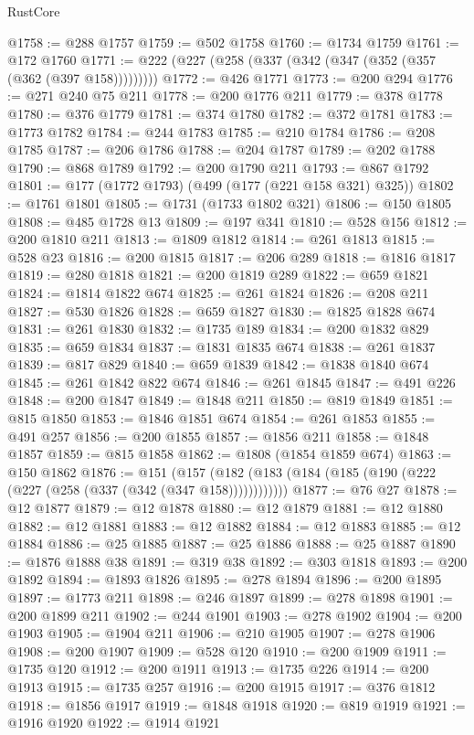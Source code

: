 \begin{lexlean}{RustCore}
\begin{coremodule}
@1758 := @288 @1757
@1759 := @502 @1758
@1760 := @1734 @1759
@1761 := @172 @1760
@1771 := @222 (@227 (@258 (@337 (@342 (@347 (@352 (@357 (@362 (@397 @158)))))))))
@1772 := @426 @1771
@1773 := @200 @294
@1776 := @271 @240 @75 @211
@1778 := @200 @1776 @211
@1779 := @378 @1778
@1780 := @376 @1779
@1781 := @374 @1780
@1782 := @372 @1781
@1783 := @1773 @1782
@1784 := @244 @1783
@1785 := @210 @1784
@1786 := @208 @1785
@1787 := @206 @1786
@1788 := @204 @1787
@1789 := @202 @1788
@1790 := @868 @1789
@1792 := @200 @1790 @211
@1793 := @867 @1792
@1801 := @177 (@1772 @1793) (@499 (@177 (@221 @158 @321) @325))
@1802 := @1761 @1801
@1805 := @1731 (@1733 @1802 @321)
@1806 := @150 @1805
@1808 := @485 @1728 @13
@1809 := @197 @341
@1810 := @528 @156
@1812 := @200 @1810 @211
@1813 := @1809 @1812
@1814 := @261 @1813
@1815 := @528 @23
@1816 := @200 @1815
@1817 := @206 @289
@1818 := @1816 @1817
@1819 := @280 @1818
@1821 := @200 @1819 @289
@1822 := @659 @1821
@1824 := @1814 @1822 @674
@1825 := @261 @1824
@1826 := @208 @211
@1827 := @530 @1826
@1828 := @659 @1827
@1830 := @1825 @1828 @674
@1831 := @261 @1830
@1832 := @1735 @189
@1834 := @200 @1832 @829
@1835 := @659 @1834
@1837 := @1831 @1835 @674
@1838 := @261 @1837
@1839 := @817 @829
@1840 := @659 @1839
@1842 := @1838 @1840 @674
@1845 := @261 @1842 @822 @674
@1846 := @261 @1845
@1847 := @491 @226
@1848 := @200 @1847
@1849 := @1848 @211
@1850 := @819 @1849
@1851 := @815 @1850
@1853 := @1846 @1851 @674
@1854 := @261 @1853
@1855 := @491 @257
@1856 := @200 @1855
@1857 := @1856 @211
@1858 := @1848 @1857
@1859 := @815 @1858
@1862 := @1808 (@1854 @1859 @674)
@1863 := @150 @1862
@1876 := @151
    (@157 (@182 (@183 (@184 (@185 (@190 (@222 (@227 (@258 (@337 (@342 (@347 @158))))))))))))
@1877 := @76 @27
@1878 := @12 @1877
@1879 := @12 @1878
@1880 := @12 @1879
@1881 := @12 @1880
@1882 := @12 @1881
@1883 := @12 @1882
@1884 := @12 @1883
@1885 := @12 @1884
@1886 := @25 @1885
@1887 := @25 @1886
@1888 := @25 @1887
@1890 := @1876 @1888 @38
@1891 := @319 @38
@1892 := @303 @1818
@1893 := @200 @1892
@1894 := @1893 @1826
@1895 := @278 @1894
@1896 := @200 @1895
@1897 := @1773 @211
@1898 := @246 @1897
@1899 := @278 @1898
@1901 := @200 @1899 @211
@1902 := @244 @1901
@1903 := @278 @1902
@1904 := @200 @1903
@1905 := @1904 @211
@1906 := @210 @1905
@1907 := @278 @1906
@1908 := @200 @1907
@1909 := @528 @120
@1910 := @200 @1909
@1911 := @1735 @120
@1912 := @200 @1911
@1913 := @1735 @226
@1914 := @200 @1913
@1915 := @1735 @257
@1916 := @200 @1915
@1917 := @376 @1812
@1918 := @1856 @1917
@1919 := @1848 @1918
@1920 := @819 @1919
@1921 := @1916 @1920
@1922 := @1914 @1921

\end{coremodule}
\end{lexlean}
